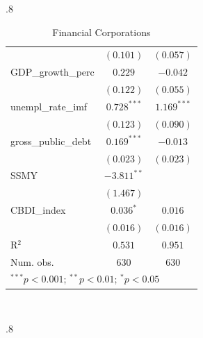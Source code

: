 \begin{table} [H]
\begin{subtable}[c]{.8\textwidth}
{\begin{tabular}{l c c}
                    & $(0.101)$      & $(0.057)$      \\
GDP\_growth\_perc   & $0.229$        & $-0.042$       \\
                    & $(0.122)$      & $(0.055)$      \\
unempl\_rate\_imf   & $0.728^{***}$  & $1.169^{***}$  \\
                    & $(0.123)$      & $(0.090)$      \\
gross\_public\_debt & $0.169^{***}$  & $-0.013$       \\
                    & $(0.023)$      & $(0.023)$      \\
SSMY                & $-3.811^{**}$  &                \\
                    & $(1.467)$      &                \\
CBDI\_index         & $0.036^{*}$    & $0.016$        \\
                    & $(0.016)$      & $(0.016)$      \\
\hline
R$^2$               & $0.531$        & $0.951$        \\
Num. obs.           & $630$          & $630$          \\
\hline
\multicolumn{3}{l}{\scriptsize{$^{***}p<0.001$; $^{**}p<0.01$; $^{*}p<0.05$}}
\end{tabular}}

\vspace{1mm}  
\end{subtable}%
\\
\begin{subtable}[c]{.8\textwidth}
\small
\centering
\caption{Financial Corporations}


\end{subtable}
\end{table}
